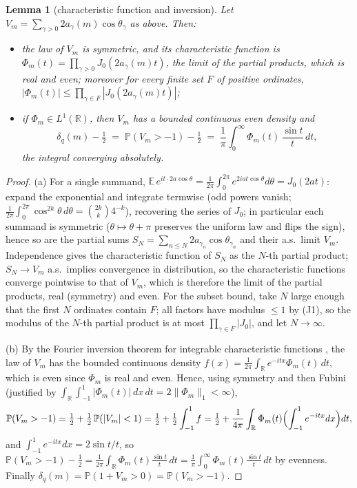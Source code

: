 \documentclass[11pt]{article}
\newtheorem{lemma}{Lemma}
\begin{document}
\begin{lemma}[characteristic function and inversion]\label{lem:invert}
Let $V_m=\sum_{\gamma>0}2a_\gamma(m)\cos\theta_\gamma$ as above. Then:
\begin{itemize}
\item[(a)] the law of $V_m$ is symmetric, and its characteristic
function is
$\Phi_m(t)=\prod_{\gamma>0}J_0(2a_\gamma(m)t)$, the limit of the
partial products, which is real and even; moreover for every finite
set $F$ of positive ordinates,
$|\Phi_m(t)|\le\prod_{\gamma\in F}|J_0(2a_\gamma(m)t)|$;
\item[(b)] if $\Phi_m\in L^1(\mathbb R)$, then $V_m$ has a bounded
continuous even density and
\[
\delta_q(m)-\tfrac12\;=\;\mathbb P(V_m>-1)-\tfrac12
\;=\;\frac1\pi\int_0^\infty\Phi_m(t)\,\frac{\sin t}{t}\,dt ,
\]
the integral converging absolutely.
\end{itemize}
\end{lemma}

\begin{proof}
(a) For a single summand, $\mathbb E\,e^{it\cdot2a\cos\theta}
=\frac1{2\pi}\int_0^{2\pi}e^{2iat\cos\theta}d\theta=J_0(2at)$: expand
the exponential and integrate termwise (odd powers vanish;
$\frac1{2\pi}\int_0^{2\pi}\cos^{2k}\theta\,d\theta
=\binom{2k}{k}4^{-k}$), recovering the series of $J_0$; in particular
each summand is symmetric ($\theta\mapsto\theta+\pi$ preserves the
uniform law and flips the sign), hence so are the partial sums
$S_N=\sum_{n\le N}2a_{\gamma_n}\cos\theta_{\gamma_n}$ and their a.s.\
limit $V_m$. Independence gives the characteristic function of $S_N$
as the $N$-th partial product; $S_N\to V_m$ a.s.\ implies convergence
in distribution, so the characteristic functions converge pointwise
to that of $V_m$, which is therefore the limit of the partial
products, real (symmetry) and even. For the subset bound, take
$N$ large enough that the first $N$ ordinates contain $F$; all
factors have modulus $\le1$ by (J1), so the modulus of the $N$-th
partial product is at most $\prod_{\gamma\in F}|J_0|$, and let
$N\to\infty$.

(b) By the Fourier inversion theorem for integrable characteristic
functions \cite[Ch.~XV.3]{Fel71}, the law of $V_m$ has the bounded
continuous density $f(x)=\frac1{2\pi}\int_{\mathbb R}
e^{-itx}\Phi_m(t)\,dt$, which is even since $\Phi_m$ is real and
even. Hence, using symmetry and then Fubini (justified by
$\int_{\mathbb R}\int_{-1}^1|\Phi_m(t)|\,dx\,dt
=2\|\Phi_m\|_1<\infty$),
\[
\mathbb P(V_m>-1)=\tfrac12+\tfrac12\,\mathbb P(|V_m|<1)
=\tfrac12+\tfrac12\int_{-1}^1 f
=\tfrac12+\frac1{4\pi}\int_{\mathbb R}\Phi_m(t)\Bigl(\int_{-1}^1
e^{-itx}dx\Bigr)dt ,
\]
and $\int_{-1}^1e^{-itx}dx=2\sin t/t$, so
$\mathbb P(V_m>-1)-\tfrac12=\frac1{2\pi}\int_{\mathbb R}\Phi_m(t)
\frac{\sin t}t\,dt=\frac1\pi\int_0^\infty\Phi_m(t)\frac{\sin t}t\,dt$
by evenness. Finally $\delta_q(m)=\mathbb P(1+V_m>0)
=\mathbb P(V_m>-1)$.
\end{proof}
\end{document}
